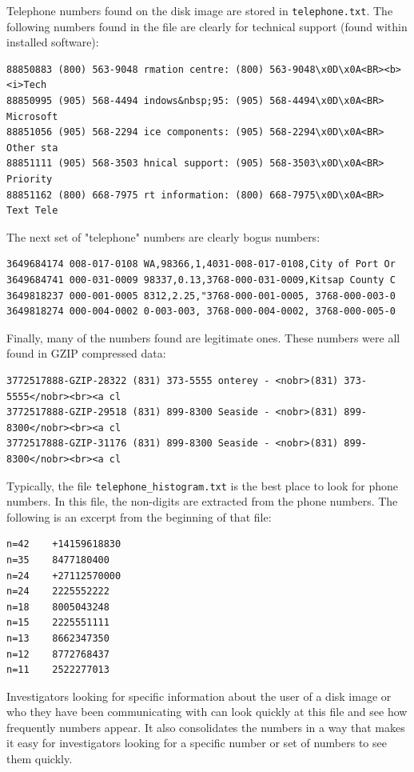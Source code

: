 Telephone numbers found on the disk image are stored in \texttt{telephone.txt}. The following numbers found in the file are clearly for technical support (found within installed software):
\lstset{style=customfile}
\begin{lstlisting}
88850883 (800) 563-9048 rmation centre: (800) 563-9048\x0D\x0A<BR><b><i>Tech
88850995 (905) 568-4494 indows&nbsp;95: (905) 568-4494\x0D\x0A<BR> Microsoft
88851056 (905) 568-2294 ice components: (905) 568-2294\x0D\x0A<BR> Other sta
88851111 (905) 568-3503 hnical support: (905) 568-3503\x0D\x0A<BR> Priority
88851162 (800) 668-7975 rt information: (800) 668-7975\x0D\x0A<BR> Text Tele
\end{lstlisting}
The next set of "telephone" numbers are clearly bogus numbers:
\lstset{style=customfile}
\begin{lstlisting}
3649684174 008-017-0108 WA,98366,1,4031-008-017-0108,City of Port Or
3649684741 000-031-0009 98337,0.13,3768-000-031-0009,Kitsap County C
3649818237 000-001-0005 8312,2.25,"3768-000-001-0005, 3768-000-003-0
3649818274 000-004-0002 0-003-003, 3768-000-004-0002, 3768-000-005-0
\end{lstlisting}
Finally, many of the numbers found are legitimate ones. These numbers were all found in GZIP compressed data:
\lstset{style=customfile}
\begin{lstlisting}
3772517888-GZIP-28322 (831) 373-5555 onterey - <nobr>(831) 373-5555</nobr><br><a cl
3772517888-GZIP-29518 (831) 899-8300 Seaside - <nobr>(831) 899-8300</nobr><br><a cl
3772517888-GZIP-31176 (831) 899-8300 Seaside - <nobr>(831) 899-8300</nobr><br><a cl
\end{lstlisting}
Typically, the file \texttt{telephone\_histogram.txt} is the best place to look for phone numbers. In this file, the non-digits are extracted from the phone numbers. The following is an excerpt from the beginning of that file:
\lstset{style=customfile}
\begin{lstlisting}
n=42	+14159618830
n=35	8477180400
n=24	+27112570000
n=24	2225552222
n=18	8005043248
n=15	2225551111
n=13	8662347350
n=12	8772768437
n=11	2522277013
\end{lstlisting}
Investigators looking for specific information about the user of a disk image or who they have been communicating with can look quickly at this file and see how frequently numbers appear. It also consolidates the numbers in a way that makes it easy for investigators looking for a specific number or set of numbers to see them quickly.\\

